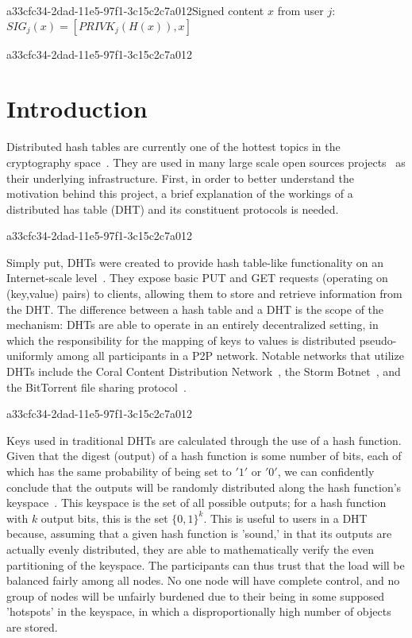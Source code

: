 \documentclass[12pt]{article}
\begin{document}
a33cfc34-2dad-11e5-97f1-3c15c2c7a012Signed content $x$ from user $j$: $SIG_j(x) = \left[ PRIVK_j( H(x) ), x \right]$

a33cfc34-2dad-11e5-97f1-3c15c2c7a012\section{Introduction}
\par Distributed hash tables are currently one of the hottest topics in the cryptography space~\cite{Stoica:2001dj,Rowstron:2001ea,Ratnasamy:2001wn}. They are used in many large scale open sources projects~\cite{Freitas:2013tb,Xu:2010vs,Perfitt:2010fh} as their underlying infrastructure. First, in order to better understand the motivation behind this project, a brief explanation of the workings of a distributed has table (DHT) and its constituent protocols is needed.

a33cfc34-2dad-11e5-97f1-3c15c2c7a012\par Simply put, DHTs were created to provide hash table-like functionality on an Internet-scale level~\cite{Ratnasamy:2001wn}. They expose basic PUT and GET requests (operating on (key,value) pairs) to clients, allowing them to store and retrieve information from the DHT. The difference between a hash table and a DHT is the scope of the mechanism: DHTs are able to operate in an entirely decentralized setting, in which the responsibility for the mapping of keys to values is distributed pseudo-uniformly among all participants in a P2P network. Notable networks that utilize DHTs include the Coral Content Distribution Network~\cite{Freedman:2004vb}, the Storm Botnet~\cite{Holz:2008uk}, and the BitTorrent file sharing protocol~\cite{Cohen:y1_8mBnw}.

a33cfc34-2dad-11e5-97f1-3c15c2c7a012\par Keys used in traditional DHTs are calculated through the use of a hash function. Given that the digest (output) of a hash function is some number of bits, each of which has the same probability of being set to $'1'$ or $'0'$, we can confidently conclude that the outputs will be randomly distributed along the hash function's keyspace~. This keyspace is the set of all possible outputs; for a hash function with $k$ output bits, this is the set $\{0,1\}^k$. This is useful to users in a DHT because, assuming that a given hash function is 'sound,' in that its outputs are actually evenly distributed, they are able to mathematically verify the even partitioning of the keyspace. The participants can thus trust that the load will be balanced fairly among all nodes. No one node will have complete control, and no group of nodes will be unfairly burdened due to their being in some supposed 'hotspots' in the keyspace, in which a disproportionally high number of objects are stored.~
\end{document}

